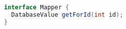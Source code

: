 
\begin{lstlisting}[language=Java, caption={MyBatis Mapper interface using XML mapper file}, label={code:mybatis:xml:interface}]
interface Mapper {
  DatabaseValue getForId(int id);
}
\end{lstlisting}

